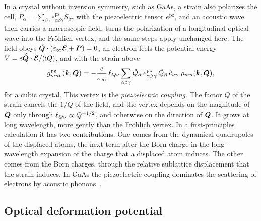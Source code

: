 In a crystal without inversion symmetry, such as GaAs, a strain also polarizes the cell, $P_\alpha = \sum_{\beta\gamma}e^{\mathrm{pz}}_{\alpha\beta\gamma}S_{\beta\gamma}$ with the piezoelectric tensor $e^{\mathrm{pz}}$, and an acoustic wave then carries a macroscopic field.  turns the polarization of a longitudinal optical wave into the Fr\"ohlich vertex, and the same steps apply unchanged here. The field obeys $\hat{\bm{Q}}\cdot(\varepsilon_\infty\bm{\mathcal{E}} + \bm{P}) = 0$, an electron feels the potential energy $V = e\hat{\bm{Q}}\cdot\bm{\mathcal{E}}/(\mathrm{i} Q)$, and with the strain above
\begin{equation*}
  g^{\mathrm{pz}}_{mn\nu}(\bm{k},\bm{Q}) = -\frac{e}{\varepsilon_\infty}\,\ell_{\bm{Q}\nu}\sum_{\alpha\beta\gamma}\hat Q_\alpha\,e^{\mathrm{pz}}_{\alpha\beta\gamma}\,\hat Q_\beta\,\hat e_{\nu\gamma}\;\rho_{mn}(\bm{k},\bm{Q}) ,
\end{equation*}
for a cubic crystal. This vertex is the \emph{piezoelectric coupling}. The factor $Q$ of the strain cancels the $1/Q$ of the field, and the vertex depends on the magnitude of $\bm{Q}$ only through $\ell_{\bm{Q}\nu} \propto Q^{-1/2}$, and otherwise on the direction of $\bm{Q}$. It grows at long wavelength, more gently than the Fr\"ohlich vertex. In a first-principles calculation it has two contributions. One comes from the dynamical quadrupoles of the displaced atoms, the next term after the Born charge in the long-wavelength expansion of the charge that a displaced atom induces. The other comes from the Born charges, through the relative sublattice displacement that the strain induces. In GaAs the piezoelectric coupling dominates the scattering of electrons by acoustic phonons~\cite{brunin2020electron}.

\subsection{Optical deformation potential}

